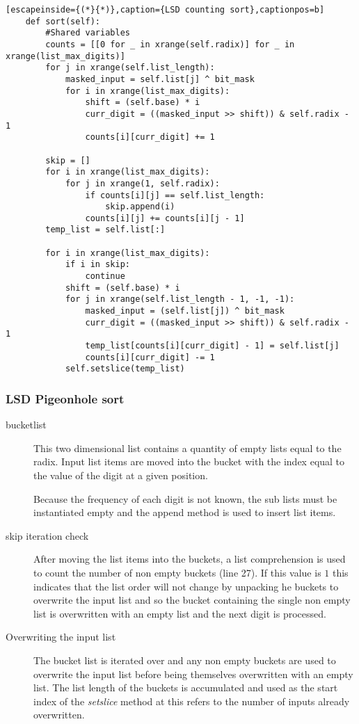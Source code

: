 \documentclass[12pt]{article}
\begin{document}
\begin{table}[H]
	\lstset{
		language=python,
    numbers=left,
    stepnumber=1,
    showstringspaces=false,
    tabsize=3,
    breaklines=true,
    breakatwhitespace=false,}
	\centering
	\begin{lstlisting}[escapeinside={(*}{*)},caption={LSD counting sort},captionpos=b]
	def sort(self):
		#Shared variables		
		counts = [[0 for _ in xrange(self.radix)] for _ in xrange(list_max_digits)]
		for j in xrange(self.list_length):
			masked_input = self.list[j] ^ bit_mask
			for i in xrange(list_max_digits):
				shift = (self.base) * i
				curr_digit = ((masked_input >> shift)) & self.radix - 1
				counts[i][curr_digit] += 1

		skip = []
		for i in xrange(list_max_digits):
			for j in xrange(1, self.radix):
				if counts[i][j] == self.list_length:
					skip.append(i)
				counts[i][j] += counts[i][j - 1]
		temp_list = self.list[:]

		for i in xrange(list_max_digits):
			if i in skip:
				continue
			shift = (self.base) * i
			for j in xrange(self.list_length - 1, -1, -1):
				masked_input = (self.list[j]) ^ bit_mask
				curr_digit = ((masked_input >> shift)) & self.radix - 1
				temp_list[counts[i][curr_digit] - 1] = self.list[j]
				counts[i][curr_digit] -= 1
			self.setslice(temp_list)
	\end{lstlisting}
\end{table}
\pagebreak
\subsubsection{LSD Pigeonhole sort}
\begin{description}
	\item[bucket\textunderscore list] This two dimensional list contains a quantity of empty lists equal to the radix. Input list items are moved into the bucket with the index equal to the value of the digit at a given position.\par Because the frequency of each digit is not known, the sub lists must be instantiated empty and the append method is used to insert list items.
	\item[skip iteration check] After moving the list items into the buckets, a list comprehension is used to count the number of non empty buckets (line 27). If this value is $1$ this indicates that the list order will not change by unpacking he buckets to overwrite the input list and so the bucket containing the single non empty list is overwritten with an empty list and the next digit is processed.
	\item[Overwriting the input list] The bucket list is iterated over and any non empty buckets are used to overwrite the input list before being themselves overwritten with an empty list. The list length of the buckets is accumulated and used as the start index of the \textit{setslice} method at this refers to the number of inputs already overwritten.
\end{description}
\end{document}
